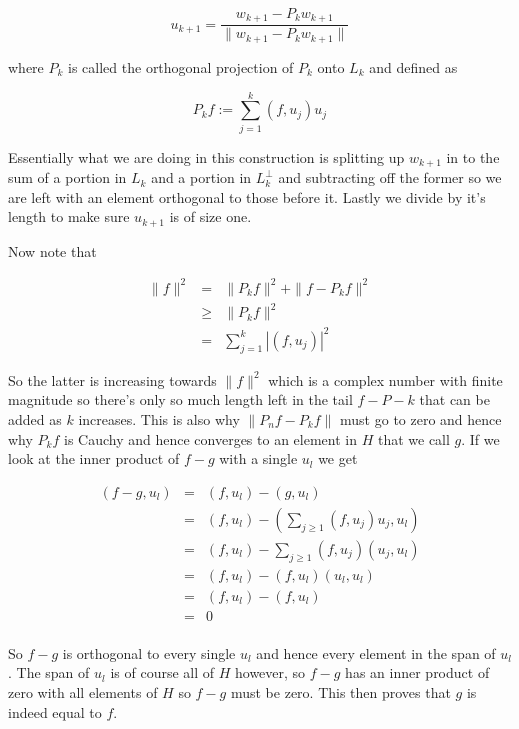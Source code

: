 \documentclass[oneside]{book}
\begin{document}
\begin{equation}
u_{k+1} = \frac{w_{k+1}-P_k w_{k+1}}{\|w_{k+1}-P_k w_{k+1}\|}
\end{equation}

where $P_k$ is called the orthogonal projection of $P_k$ onto $L_k$ and defined as

\begin{equation}
P_k f := \sum_{j=1}^k (f,u_j)u_j
\end{equation}

Essentially what we are doing in this construction is splitting up $w_{k+1}$ in to the sum of a portion in $L_k$ and a portion in $L_k^\perp$ and subtracting off the former so we are left with an element orthogonal to those before it. Lastly we divide by it's length to make sure $u_{k+1}$ is of size one. 

Now note that

\begin{eqnarray}
\|f\|^2 &=& \|P_kf\|^2 + \|f-P_kf\|^2 \nonumber\\
&\ge& \|P_kf\|^2 \nonumber\\
&=& \sum_{j=1}^k |(f,u_j)|^2
\end{eqnarray}

So the latter is increasing towards $\|f\|^2$ which is a complex number with finite magnitude so there's only so much length left in the tail $f-P-k$ that can be added as $k$ increases. This is also why  $\|P_n f - P_k f\|$ must go to zero and hence why $P_k f$ is Cauchy and hence converges to an element in $H$ that we call $g$. If we look at the inner product of $f-g$ with a single $u_l$ we get

\begin{eqnarray}
(f-g,u_l) &=& (f,u_l) - (g,u_l)\nonumber\\
&=& (f,u_l) - \left(\sum_{j \ge 1} (f,u_j)u_j,u_l \right)\nonumber\\
&=& (f,u_l) - \sum_{j \ge 1} (f,u_j) (u_j,u_l)\nonumber\\
&=& (f,u_l) -  (f,u_l) (u_l,u_l)\nonumber\\
&=& (f,u_l) -  (f,u_l)\nonumber\\
&=& 0\nonumber\\
\end{eqnarray}  

So $f-g$ is orthogonal to every single $u_l$ and hence every element in the span of $u_l$. The span of $u_l$ is of course all of $H$ however, so $f-g$ has an inner product of zero with all elements of $H$ so $f-g$ must be zero. This then proves that $g$ is indeed equal to $f$.
\end{document}
